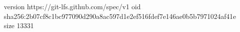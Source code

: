 version https://git-lfs.github.com/spec/v1
oid sha256:2b07cf8c1bc977090d290a8ac597d1e2ef516fdef7e146ae0b5b7971024af41e
size 13331
